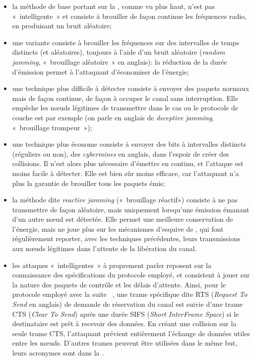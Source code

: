\begin{itemize}
    \item la méthode de base portant sur la , comme vu plus haut, n'est pas « intelligente » et consiste à brouiller de façon continue les fréquences radio, en produisant un bruit aléatoire;
    \item une variante consiste à brouiller les fréquences sur des intervalles de temps distincts (et aléatoires), toujours à l'aide d'un bruit aléatoire (\textit{random jamming}, « brouillage aléatoire » en anglais): la réduction de la durée d'émission permet à l'attaquant d'économiser de l'énergie;
    \item une technique plus difficile à détecter consiste à envoyer des paquets normaux mais de façon continue, de façon à occuper le canal sans interruption. Elle empêche les nœuds légitimes de transmettre dans le cas ou le protocole de couche \mac{} est \csmaca par exemple (on parle en anglais de \textit{deceptive jamming}, « brouillage trompeur »);
    \item une technique plus économe consiste à envoyer des bits à intervalles distincts (réguliers ou non), des \textit{cybermines} en anglais, dans l'espoir de créer des collisions. Il n'est alors plus nécessaire d'émettre en continu, et l'attaque est moins facile à détecter. Elle est bien sûr moins efficace, car l'attaquant n'a plus la garantie de brouiller tous les paquets émis;
    \item la méthode dite \textit{reactive jamming} (« brouillage réactif») consiste à ne pas transmettre de façon aléatoire, mais uniquement lorsqu'une émission émanant d'un autre nœud est détectée. Elle permet une meilleure conservation de l'énergie, mais ne joue plus sur les mécanismes d'esquive de , qui font régulièrement reporter, avec les techniques précédentes, leurs transmissions aux nœuds légitimes dans l'attente de la libération du canal.
    \item les attaques « intelligentes » à proprement parler reposent sur la connaissance des spécifications du protocole \mac employé, et consistent à jouer sur la nature des paquets de contrôle et les délais d'attente. Ainsi, pour le protocole \csmaca employé avec la suite \ieeee~\cite{ieee802.11}, une trame spécifique dite RTS (\textit{Request To Send} en anglais) de demande de réservation du canal est suivie d'une trame CTS (\textit{Clear To Send}) après une durée SIFS (\textit{Short InterFrame Space}) si le destinataire est prêt à recevoir des données. En créant une collision sur la seule trame CTS, l'attaquant prévient entièrement l'échange de données utiles entre les nœuds. D'autres trames peuvent être utilisées dans le même but, leurs acronymes sont dans la .
\end{itemize}
